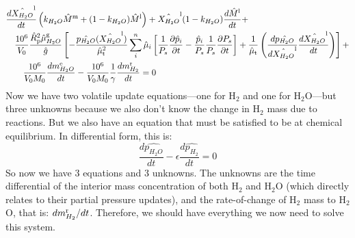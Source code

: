 \begin{align}
&\frac{d \hat{X_{H_2O}}^{\rm l}}{d t} \left(k_{H_2O} \hat{M}^{\rm m} + (1-k_{H_2O}) \hat{M}^{\rm l} \right)
+ \hat{X_{H_2O}}^{\rm l} (1-k_{H_2O}) \frac{d \hat{M}^{\rm l}}{d t} + \nonumber \\
&\quad \frac{10^6}{V_0} \frac{\hat{R}_{\rm p}^2 \hat{\mu}_{H_2O}^{\rm g}}{\hat{g}}
\left[
-\frac{\hat{p_{H_2O}}(\hat{X_{H_2O}}^{\rm l})}{\hat{\mu}_{\rm t}^2} \sum_i^n \hat{\mu}_i \left[ \frac{1}{P_s} \frac{\partial \hat{p}_i}{\partial t} - \frac{\hat{p}_i}{P_s} \frac{1}{P_s} \frac{\partial P_s}{\partial t} \right] + \frac{1}{\hat{\mu}_{\rm t}} \left( \frac{d \hat{p_{H_2O}}}{d \hat{X_{H_2O}}^{\rm l}} \frac{d \hat{X_{H_2O}}^{\rm l}}{d t} \right)
\right]+ \nonumber \\
& \qquad \frac{10^6}{V_0 M_0} \frac{dm_{H_2O}^{\rm e}}{dt} - \frac{10^6}{V_0 M_0} \frac{1}{\gamma} \frac{dm_{H_2}^{\rm r}}{dt} = 0
\end{align}
Now we have two volatile update equations---one for H$_2$ and one for H$_2$O---but three unknowns because we also don't know the change in H$_2$ mass due to reactions.  But we also have an equation that must be satisfied to be at chemical equilibrium.  In differential form, this is:
\begin{equation}
\frac{d\hat{p_{H_2O}}}{dt} - \epsilon \frac{d\hat{p_{H_2}}}{dt} = 0
\end{equation}
So now we have 3 equations and 3 unknowns.  The unknowns are the time differential of the interior mass concentration of both H$_2$ and H$_2$O (which directly relates to their partial pressure updates), and the rate-of-change of H$_2$ mass to H$_2$O, that is: $dm^{\rm r}_{H_2}/dt$.  Therefore, we should have everything we now need to solve this system.
